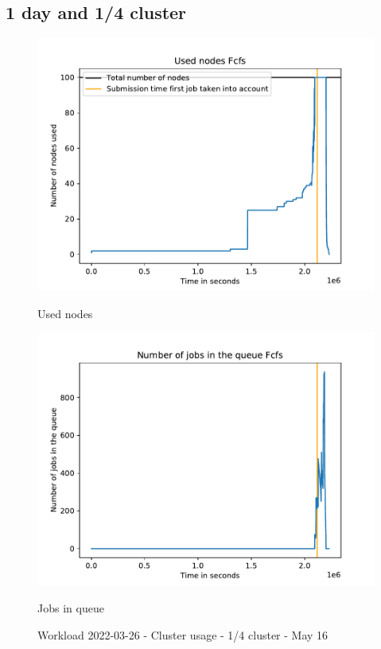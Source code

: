 \documentclass[a4paper]{article}
\begin{document}
	\subsection{1 day and 1/4 cluster}
	\begin{figure}[H]\begin{minipage}[b]{0.5\linewidth}\centering\includegraphics[width=1\linewidth]{MBSS/plot/2022-03-26->2022-03-26_Fcfs_Used_nodes_95_128_4_256_1_1024.pdf}\caption{Used nodes}\vspace{4ex}\end{minipage}%
	\begin{minipage}[b]{0.5\linewidth}\centering\includegraphics[width=1\linewidth]{MBSS/plot/2022-03-26->2022-03-26_Fcfs_Nb_scheduled_jobs_95_128_4_256_1_1024.pdf}\caption{Jobs in queue}\vspace{4ex}\end{minipage}\caption{Workload 2022-03-26 - Cluster usage - 1/4 cluster - May 16}\end{figure}
	
\end{document}
